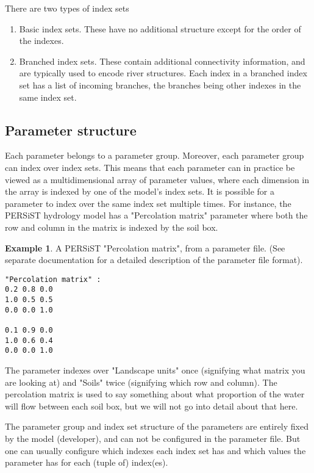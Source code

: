 \documentclass[11pt]{article}
\theoremstyle{definition}
\newtheorem{myexample}{Example}
\newenvironment{example}%
  {\begin{lrbox}{\examplebox}%
   \begin{minipage}{\dimexpr\linewidth-2\fboxsep}
   \begin{myexample}}%
  {\end{myexample}%
   \end{minipage}%
   \end{lrbox}%
   \begin{trivlist}
     \item[]\colorbox{silver}{\usebox\examplebox}
   \end{trivlist}}
\begin{document}
There are two types of index sets
\begin{enumerate}[i]
\item Basic index sets. These have no additional structure except for the order of the indexes.
\item Branched index sets. These contain additional connectivity information, and are typically used to encode river structures. Each index in a branched index set has a list of incoming branches, the branches being other indexes in the same index set.
\end{enumerate}

\subsection{Parameter structure}
Each parameter belongs to a parameter group. Moreover, each parameter group can index over index sets. This means that each parameter can in practice be viewed as a multidimensional array of parameter values, where each dimension in the array is indexed by one of the model's index sets. It is possible for a parameter to index over the same index set multiple times. For instance, the PERSiST hydrology model \cite{futter14} has a "Percolation matrix" parameter where both the row and column in the matrix is indexed by the soil box.

\begin{example}
A PERSiST "Percolation matrix", from a parameter file. (See separate documentation for a detailed description of the parameter file format).
\begin{lstlisting}[style=textstyle]
"Percolation matrix" :
0.2 0.8 0.0
1.0 0.5 0.5
0.0 0.0 1.0

0.1 0.9 0.0
1.0 0.6 0.4
0.0 0.0 1.0
\end{lstlisting}
The parameter indexes over "Landscape units" once (signifying what matrix you are looking at) and "Soils" twice (signifying which row and column). The percolation matrix is used to say something about what proportion of the water will flow between each soil box, but we will not go into detail about that here.
\end{example}

The parameter group and index set structure of the parameters are entirely fixed by the model (developer), and can not be configured in the parameter file. But one can usually configure which indexes each index set has and which values the parameter has for each (tuple of) index(es). 
\end{document}
